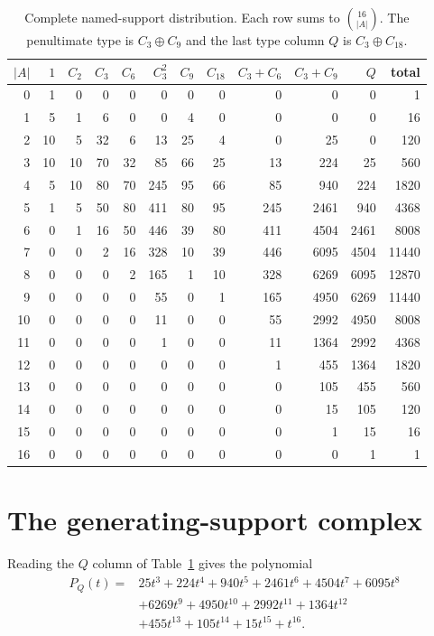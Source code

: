 \documentclass[10pt]{article}
\begin{document}
\begin{table}[htbp]
\centering
\scriptsize
\setlength{\tabcolsep}{3.2pt}
\begin{tabular}{r|rrrrrrrrrr|r}
\toprule
$|A|$&$1$&$C_2$&$C_3$&$C_6$&$C_3^2$&$C_9$&$C_{18}$&$C_3{+}C_6$&$C_3{+}C_9$&$Q$&total\\
\midrule
0&1&0&0&0&0&0&0&0&0&0&1\\
1&5&1&6&0&0&4&0&0&0&0&16\\
2&10&5&32&6&13&25&4&0&25&0&120\\
3&10&10&70&32&85&66&25&13&224&25&560\\
4&5&10&80&70&245&95&66&85&940&224&1820\\
5&1&5&50&80&411&80&95&245&2461&940&4368\\
6&0&1&16&50&446&39&80&411&4504&2461&8008\\
7&0&0&2&16&328&10&39&446&6095&4504&11440\\
8&0&0&0&2&165&1&10&328&6269&6095&12870\\
9&0&0&0&0&55&0&1&165&4950&6269&11440\\
10&0&0&0&0&11&0&0&55&2992&4950&8008\\
11&0&0&0&0&1&0&0&11&1364&2992&4368\\
12&0&0&0&0&0&0&0&1&455&1364&1820\\
13&0&0&0&0&0&0&0&0&105&455&560\\
14&0&0&0&0&0&0&0&0&15&105&120\\
15&0&0&0&0&0&0&0&0&1&15&16\\
16&0&0&0&0&0&0&0&0&0&1&1\\
\bottomrule
\end{tabular}
\caption{Complete named-support distribution.  Each row sums to
$\binom{16}{|A|}$.  The penultimate type is $C_3\oplus C_9$ and the last
type column $Q$ is $C_3\oplus C_{18}$.}
\label{tab:supports}
\end{table}

\section{The generating-support complex}
Reading the $Q$ column of Table~\ref{tab:supports} gives the polynomial
\begin{equation}\label{eq:poly}
\begin{split}
P_Q(t)={}&25t^3+224t^4+940t^5+2461t^6+4504t^7+6095t^8\\
&+6269t^9+4950t^{10}+2992t^{11}+1364t^{12}\\
&+455t^{13}+105t^{14}+15t^{15}+t^{16}.
\end{split}
\end{equation}
\end{document}
